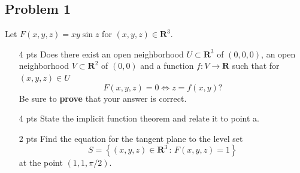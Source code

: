 \documentclass[12pt]{article}
\newcommand\setb[1]{\left \{ #1 \right \}}
\theoremstyle{definition}
\begin{document}
\subsection{Problem 1 \texorpdfstring{\cite{Melody}}{}}
Let $F(x,y,z) = xy \sin z$ for $(x,y,z) \in \mathbf{R}^3$.
\begin{enumerate}[a.]
    \item [4 pts]Does there exist an open neighborhood $U \subset \mathbf{R}^3$ of $(0,0,0)$, an open neighborhood $V \subset \mathbf{R}^2$ of $(0,0)$ and a function $f : V \to \mathbf{R}$ such that for $(x,y,z) \in U$
    \[
        F(x,y,z) = 0 \Leftrightarrow z = f(x,y)?
    \]
    Be sure to \textbf{prove} that your answer is correct.
    \item [4 pts]State the implicit function theorem and relate it to point a.
    \item [2 pts]Find the equation for the tangent plane to the level set 
    \[
        S = \setb{ (x,y,z) \in \mathbf{R}^3 \, : \, F(x,y,z) = 1 }
    \]
    at the point $(1,1,\pi/2)$.
\end{enumerate}
\end{document}
